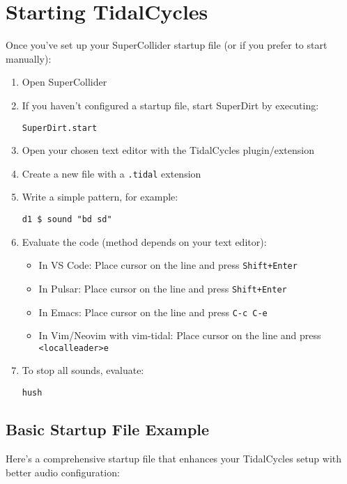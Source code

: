 \documentclass[11pt,a4paper]{article}
\begin{document}
\section{Starting TidalCycles}

Once you've set up your SuperCollider startup file (or if you prefer to start manually):

\begin{enumerate}
    \item Open SuperCollider
    \item If you haven't configured a startup file, start SuperDirt by executing:
    \begin{lstlisting}[style=supercollider]
SuperDirt.start
    \end{lstlisting}
    \item Open your chosen text editor with the TidalCycles plugin/extension
    \item Create a new file with a \texttt{.tidal} extension
    \item Write a simple pattern, for example:
    \begin{lstlisting}[style=haskell]
d1 $ sound "bd sd"
    \end{lstlisting}
    \item Evaluate the code (method depends on your text editor):
    \begin{itemize}
        \item In VS Code: Place cursor on the line and press \texttt{Shift+Enter}
        \item In Pulsar: Place cursor on the line and press \texttt{Shift+Enter}
        \item In Emacs: Place cursor on the line and press \texttt{C-c C-e}
        \item In Vim/Neovim with vim-tidal: Place cursor on the line and press \texttt{<localleader>e}
    \end{itemize}

    \item To stop all sounds, evaluate:
    \begin{lstlisting}[style=haskell]
hush
    \end{lstlisting}
\end{enumerate}

\subsection{Basic Startup File Example}

Here's a comprehensive startup file that enhances your TidalCycles setup with better audio configuration:
\end{document}
